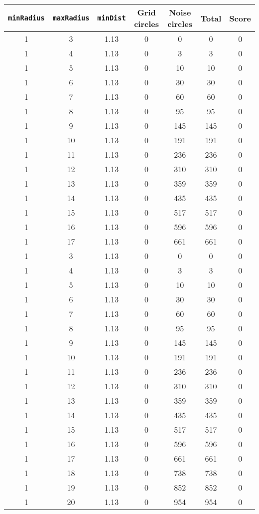 \documentclass[letterpaper, 12pt]{article}
\begin{document}
\begin{longtable}{|c|c|c|c|c|c|c|}
\hline
\textbf{\texttt{minRadius}} & \textbf{\texttt{maxRadius}} & \textbf{\texttt{minDist}} & \textbf{Grid circles} & \textbf{Noise circles} & \textbf{Total} & \textbf{Score} \\
\hline
1 & 3 & 1.13 & 0 & 0 & 0 & 0 \\
\hline
1 & 4 & 1.13 & 0 & 3 & 3 & 0 \\
\hline
1 & 5 & 1.13 & 0 & 10 & 10 & 0 \\
\hline
1 & 6 & 1.13 & 0 & 30 & 30 & 0 \\
\hline
1 & 7 & 1.13 & 0 & 60 & 60 & 0 \\
\hline
1 & 8 & 1.13 & 0 & 95 & 95 & 0 \\
\hline
1 & 9 & 1.13 & 0 & 145 & 145 & 0 \\
\hline
1 & 10 & 1.13 & 0 & 191 & 191 & 0 \\
\hline
1 & 11 & 1.13 & 0 & 236 & 236 & 0 \\
\hline
1 & 12 & 1.13 & 0 & 310 & 310 & 0 \\
\hline
1 & 13 & 1.13 & 0 & 359 & 359 & 0 \\
\hline
1 & 14 & 1.13 & 0 & 435 & 435 & 0 \\
\hline
1 & 15 & 1.13 & 0 & 517 & 517 & 0 \\
\hline
1 & 16 & 1.13 & 0 & 596 & 596 & 0 \\
\hline
1 & 17 & 1.13 & 0 & 661 & 661 & 0 \\
\hline
1 & 3 & 1.13 & 0 & 0 & 0 & 0 \\
\hline
1 & 4 & 1.13 & 0 & 3 & 3 & 0 \\
\hline
1 & 5 & 1.13 & 0 & 10 & 10 & 0 \\
\hline
1 & 6 & 1.13 & 0 & 30 & 30 & 0 \\
\hline
1 & 7 & 1.13 & 0 & 60 & 60 & 0 \\
\hline
1 & 8 & 1.13 & 0 & 95 & 95 & 0 \\
\hline
1 & 9 & 1.13 & 0 & 145 & 145 & 0 \\
\hline
1 & 10 & 1.13 & 0 & 191 & 191 & 0 \\
\hline
1 & 11 & 1.13 & 0 & 236 & 236 & 0 \\
\hline
1 & 12 & 1.13 & 0 & 310 & 310 & 0 \\
\hline
1 & 13 & 1.13 & 0 & 359 & 359 & 0 \\
\hline
1 & 14 & 1.13 & 0 & 435 & 435 & 0 \\
\hline
1 & 15 & 1.13 & 0 & 517 & 517 & 0 \\
\hline
1 & 16 & 1.13 & 0 & 596 & 596 & 0 \\
\hline
1 & 17 & 1.13 & 0 & 661 & 661 & 0 \\
\hline
1 & 18 & 1.13 & 0 & 738 & 738 & 0 \\
\hline
1 & 19 & 1.13 & 0 & 852 & 852 & 0 \\
\hline
1 & 20 & 1.13 & 0 & 954 & 954 & 0 \\
\hline
\end{longtable}
\end{document}
